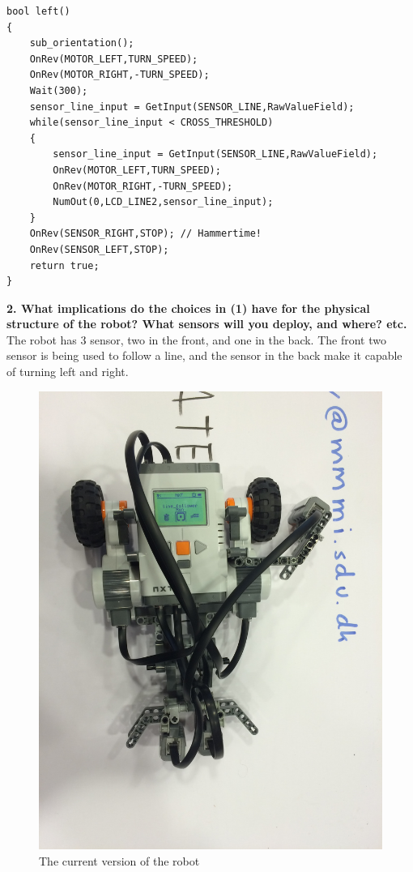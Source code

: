 \documentclass[10pt,a4paper]{article}
\begin{document}
     
\begin{lstlisting}
bool left()
{
    sub_orientation();
    OnRev(MOTOR_LEFT,TURN_SPEED);
    OnRev(MOTOR_RIGHT,-TURN_SPEED);
    Wait(300);  
    sensor_line_input = GetInput(SENSOR_LINE,RawValueField);
    while(sensor_line_input < CROSS_THRESHOLD)
    {       
        sensor_line_input = GetInput(SENSOR_LINE,RawValueField);
        OnRev(MOTOR_LEFT,TURN_SPEED);
        OnRev(MOTOR_RIGHT,-TURN_SPEED);        
        NumOut(0,LCD_LINE2,sensor_line_input);
    }  
    OnRev(SENSOR_RIGHT,STOP); // Hammertime!
    OnRev(SENSOR_LEFT,STOP);  
    return true;
}
\end{lstlisting}
    
     
   \textbf{2.  What implications do the choices in (1) have for the physical structure of the
     robot?  What sensors will you deploy, and where?  etc.}\\


The robot has 3 sensor,  two in the front, and one in the back.  The front two sensor is being used to follow a line, and the sensor in the back make it capable of turning left and right. 
	\begin{figure}[H]
	\begin{center}
    \includegraphics[width=\textwidth]{robot.jpg}
  \end{center}
  \caption{The current version of the robot}
\end{figure}   			
\end{document}
